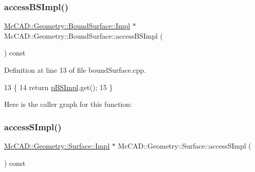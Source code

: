 \mbox{\label{classMcCAD_1_1Geometry_1_1BoundSurface_aaf5a1d89894e9a90fee2e1f355638d0b}} 
\subsubsection{\texorpdfstring{access\+B\+S\+Impl()}{accessBSImpl()}\hspace{0.1cm}{\footnotesize\ttfamily [2/2]}}
{\footnotesize\ttfamily \hyperlink{classMcCAD_1_1Geometry_1_1BoundSurface_1_1Impl}{Mc\+C\+A\+D\+::\+Geometry\+::\+Bound\+Surface\+::\+Impl} $\ast$ Mc\+C\+A\+D\+::\+Geometry\+::\+Bound\+Surface\+::access\+B\+S\+Impl (\begin{DoxyParamCaption}{ }\end{DoxyParamCaption}) const\hspace{0.3cm}{\ttfamily [inherited]}}



Definition at line 13 of file bound\+Surface.\+cpp.


\begin{DoxyCode}
13                                              \{
14   \textcolor{keywordflow}{return} \hyperlink{classMcCAD_1_1Geometry_1_1BoundSurface_ae678fabb46e22b7a68a336051b366ddf}{pBSImpl}.get();
15 \}
\end{DoxyCode}
Here is the caller graph for this function\+:
\mbox{\label{classMcCAD_1_1Geometry_1_1Surface_a989de1f9ebe3de043412014ed25e52eb}} 
\subsubsection{\texorpdfstring{access\+S\+Impl()}{accessSImpl()}\hspace{0.1cm}{\footnotesize\ttfamily [1/2]}}
{\footnotesize\ttfamily \hyperlink{classMcCAD_1_1Geometry_1_1Surface_1_1Impl}{Mc\+C\+A\+D\+::\+Geometry\+::\+Surface\+::\+Impl} $\ast$ Mc\+C\+A\+D\+::\+Geometry\+::\+Surface\+::access\+S\+Impl (\begin{DoxyParamCaption}{ }\end{DoxyParamCaption}) const\hspace{0.3cm}{\ttfamily [inherited]}}



